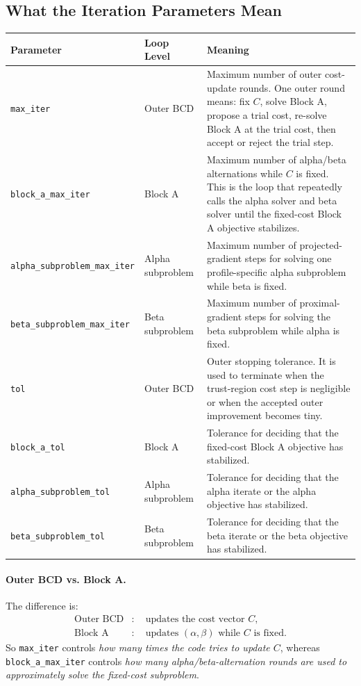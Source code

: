 \documentclass[11pt]{article}
\begin{document}
\subsection{What the Iteration Parameters Mean}
\begin{longtable}{>{\raggedright\arraybackslash}p{} >{\raggedright\arraybackslash}p{} >{\raggedright\arraybackslash}p{}}
\toprule
\textbf{Parameter} & \textbf{Loop Level} & \textbf{Meaning} \\
\midrule
\endhead
\texttt{max\_iter} & Outer BCD & Maximum number of outer cost-update rounds. One outer round means: fix $C$, solve Block A, propose a trial cost, re-solve Block A at the trial cost, then accept or reject the trial step. \\
\texttt{block\_a\_max\_iter} & Block A & Maximum number of alpha/beta alternations while $C$ is fixed. This is the loop that repeatedly calls the alpha solver and beta solver until the fixed-cost Block A objective stabilizes. \\
\texttt{alpha\_subproblem\_max\_iter} & Alpha subproblem & Maximum number of projected-gradient steps for solving one profile-specific alpha subproblem while beta is fixed. \\
\texttt{beta\_subproblem\_max\_iter} & Beta subproblem & Maximum number of proximal-gradient steps for solving the beta subproblem while alpha is fixed. \\
\texttt{tol} & Outer BCD & Outer stopping tolerance. It is used to terminate when the trust-region cost step is negligible or when the accepted outer improvement becomes tiny. \\
\texttt{block\_a\_tol} & Block A & Tolerance for deciding that the fixed-cost Block A objective has stabilized. \\
\texttt{alpha\_subproblem\_tol} & Alpha subproblem & Tolerance for deciding that the alpha iterate or the alpha objective has stabilized. \\
\texttt{beta\_subproblem\_tol} & Beta subproblem & Tolerance for deciding that the beta iterate or the beta objective has stabilized. \\
\bottomrule
\end{longtable}

\paragraph{Outer BCD vs. Block A.}
The difference is:
\begin{align*}
\text{Outer BCD} &:\quad \text{updates the cost vector } C, \\
\text{Block A} &:\quad \text{updates } (\alpha,\beta) \text{ while } C \text{ is fixed.}
\end{align*}
So \texttt{max\_iter} controls \emph{how many times the code tries to update
$C$}, whereas \texttt{block\_a\_max\_iter} controls \emph{how many
alpha/beta-alternation rounds are used to approximately solve the fixed-cost
subproblem}.
\end{document}
